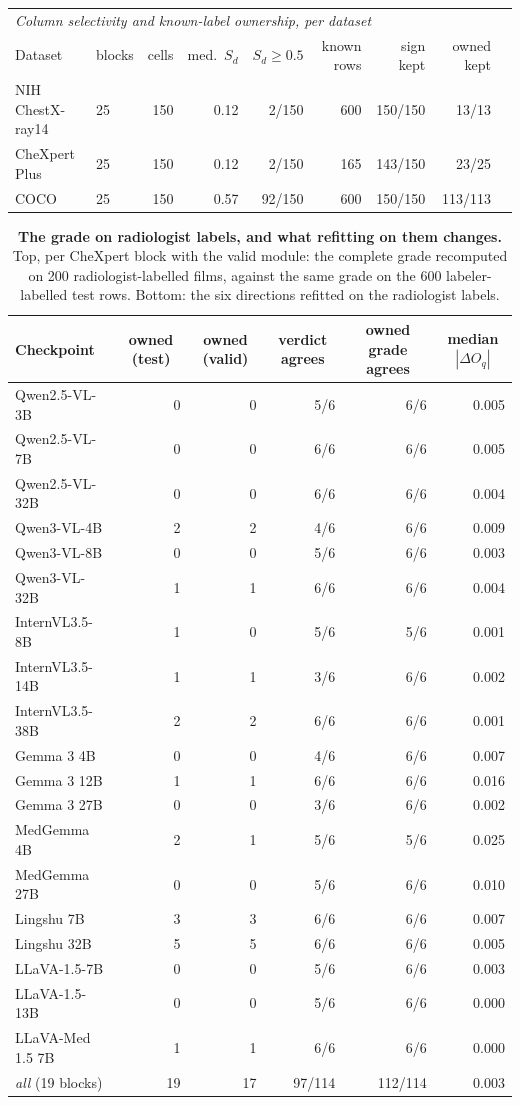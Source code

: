 \documentclass{article}
\begin{document}
\begin{table}[h]
\begin{tabular}{llrrrrrrr}
\midrule
\multicolumn{9}{l}{\textit{Column selectivity and known-label ownership, per dataset}} \\
Dataset & blocks & cells & med.\ $S_d$ & $S_d\geq0.5$ & known rows & sign kept & owned kept & \\
\midrule
NIH ChestX-ray14 & 25 & 150 & 0.12 & 2/150 & 600 & 150/150 & 13/13 & \\
CheXpert Plus & 25 & 150 & 0.12 & 2/150 & 165 & 143/150 & 23/25 & \\
COCO & 25 & 150 & 0.57 & 92/150 & 600 & 150/150 & 113/113 & \\
\bottomrule
\end{tabular}
\end{table}
\begin{table}[h]
\centering
\scriptsize
\setlength{\tabcolsep}{4pt}
\caption{\textbf{The grade on radiologist labels, and what refitting on them changes.} Top, per CheXpert block with the valid module: the complete grade recomputed on 200 radiologist-labelled films, against the same grade on the 600 labeler-labelled test rows. Bottom: the six directions refitted on the radiologist labels.}
\label{tab:cf-valid}
\begin{tabular}{lrrrrr}
\toprule
Checkpoint & \multicolumn{1}{c}{owned (test)} & \multicolumn{1}{c}{owned (valid)} & \multicolumn{1}{c}{verdict agrees} & \multicolumn{1}{c}{owned grade agrees} & \multicolumn{1}{c}{median $|\Delta O_q|$}\\
\midrule
Qwen2.5-VL-3B & 0 & 0 & 5/6 & 6/6 & 0.005 \\
Qwen2.5-VL-7B & 0 & 0 & 6/6 & 6/6 & 0.005 \\
Qwen2.5-VL-32B & 0 & 0 & 6/6 & 6/6 & 0.004 \\
Qwen3-VL-4B & 2 & 2 & 4/6 & 6/6 & 0.009 \\
Qwen3-VL-8B & 0 & 0 & 5/6 & 6/6 & 0.003 \\
Qwen3-VL-32B & 1 & 1 & 6/6 & 6/6 & 0.004 \\
InternVL3.5-8B & 1 & 0 & 5/6 & 5/6 & 0.001 \\
InternVL3.5-14B & 1 & 1 & 3/6 & 6/6 & 0.002 \\
InternVL3.5-38B & 2 & 2 & 6/6 & 6/6 & 0.001 \\
Gemma 3 4B & 0 & 0 & 4/6 & 6/6 & 0.007 \\
Gemma 3 12B & 1 & 1 & 6/6 & 6/6 & 0.016 \\
Gemma 3 27B & 0 & 0 & 3/6 & 6/6 & 0.002 \\
MedGemma 4B & 2 & 1 & 5/6 & 5/6 & 0.025 \\
MedGemma 27B & 0 & 0 & 5/6 & 6/6 & 0.010 \\
Lingshu 7B & 3 & 3 & 6/6 & 6/6 & 0.007 \\
Lingshu 32B & 5 & 5 & 6/6 & 6/6 & 0.005 \\
LLaVA-1.5-7B & 0 & 0 & 5/6 & 6/6 & 0.003 \\
LLaVA-1.5-13B & 0 & 0 & 5/6 & 6/6 & 0.000 \\
LLaVA-Med 1.5 7B & 1 & 1 & 6/6 & 6/6 & 0.000 \\
\midrule
\textit{all} (19 blocks) & 19 & 17 & 97/114 & 112/114 & 0.003 \\
\bottomrule
\end{tabular}


\end{table}
\end{document}
